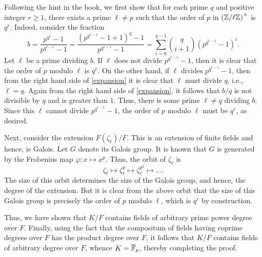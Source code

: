 \begin{exercise}
    Following the hint in the book, we first show that for each prime $q$ and positive integer $r\ge 1$, there exists a prime $\ell\ne p$ such that the order of $p$ in $\left(\mathbb{Z}/\ell\mathbb{Z}\right)^\times$ is $q^r$. Indeed, consider the fraction 
    \begin{equation}
        b = \frac{p^{q^r} - 1}{p^{q^{r - 1}} - 1} = \frac{\left(p^{q^{r - 1}} - 1 + 1\right)^q - 1}{p^{q^{r - 1}} - 1} = \sum_{i = 0}^{q - 1}\binom{q}{i + 1}\left(p^{q^{r - 1}} - 1\right)^{i}.\label{expansion}\tag{$\star$}
    \end{equation}
    Let $\ell$ be a prime dividing $b$. If $\ell$ does not divide $p^{q^{r - 1}} - 1$, then it is clear that the order of $p$ modulo $\ell$ is $q^r$. On the other hand, if $\ell$ divides $p^{q^{r - 1}} - 1$, then from the right hand side of \eqref{expansion} it is clear that $\ell$ must divide $q$, i.e., $\ell = q$. Again from the right hand side of \eqref{expansion}, it follows that $b/q$ is not divisible by $q$ and is greater than $1$. Thus, there is some prime $\ell\ne q$ dividing $b$. Since this $\ell$ cannot divide $p^{q^{r - 1}} - 1$, the order of $p$ modulo $\ell$ must be $q^r$, as desired.

    Next, consider the extension $F(\zeta_\ell)/F$. This is an extension of finite fields and hence, is Galois. Let $G$ denote its Galois group. It is known that $G$ is generated by the Frobenius map $\varphi\colon x\mapsto x^p$. Thus, the orbit of $\zeta_\ell$ is 
    \begin{equation*}
        \zeta_\ell\mapsto\zeta_\ell^p\mapsto\zeta_\ell^{p^2}\mapsto\dots.
    \end{equation*}
    The size of this orbit determines the size of the Galois group, and hence, the degree of the extension. But it is clear from the above orbit that the size of this Galois group is precisely the order of $p$ modulo $\ell$, which is $q^r$ by construction. 

    Thus, we have shown that $K/F$ contains fields of arbitrary prime power degree over $F$. Finally, using the fact that the compositum of fields having coprime degrees over $F$ has the product degree over $F$, it follows that $K/F$ contains fields of arbitrary degree over $F$, whence $K = \overline{\mathbb{F}}_p$, thereby completing the proof.
\end{exercise}

